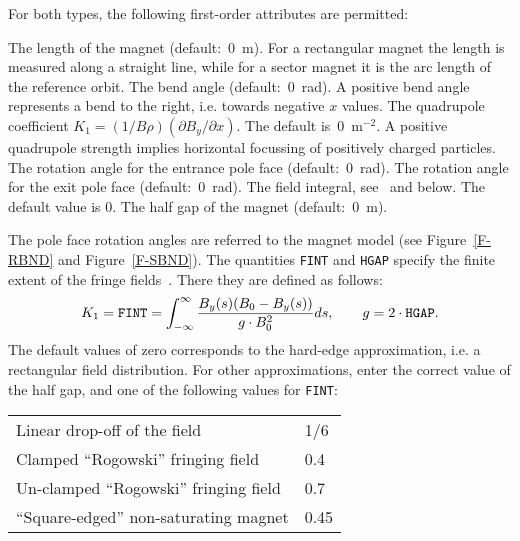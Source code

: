 For both types,
the following first-order attributes are permitted:
\begin{mylist}
The length of the magnet (default:~0~m).
For a rectangular magnet the length is measured along a straight line,
while for a sector magnet it is the arc length of the reference orbit.
The bend angle (default:~0~rad).
A positive bend angle represents a bend to the right,
i.e. towards negative \(x\) values.
The quadrupole coefficient
\(K_{1}=(1/B\rho) (\partial B_{y}/\partial x)\).
The default is~0~\(\mathrm{m}^{-2}\).
A positive quadrupole strength implies horizontal focussing
of positively charged particles.
The rotation angle for the entrance pole face
(default:~0~rad).
The rotation angle for the exit pole face
(default:~0~rad).
The field integral, see~\cite{B-BRO72} and below. The default value is 0.
The half gap of the magnet (default:~0~m).
\end{mylist}
The pole face rotation angles are referred to the magnet model
(see Figure~\ref{F-RBND} and Figure~\ref{F-SBND}).
The quantities {\tt FINT} and {\tt HGAP} specify
the finite extent of the fringe fields~\cite{B-BRO72}.
There they are defined as follows:
\[
K_1 = \hbox{\tt FINT} = \int_{-\infty}^{\infty}
\frac{B_y(s) (B_0 - B_y(s))}{g \cdot B_0^2} ds,
\qquad
g = 2 \cdot \hbox{\tt HGAP}.
\]
The default values of zero corresponds to the hard-edge approximation,
i.e. a rectangular field distribution.
For other approximations, enter the correct value of the half gap,
and one of the following values for {\tt FINT}:
\begin{center}
\begin{tabular}{ll}
Linear drop-off of the field           &1/6 \\
Clamped ``Rogowski'' fringing field    &0.4 \\
Un-clamped ``Rogowski'' fringing field  &0.7 \\
``Square-edged'' non-saturating magnet &0.45
\end{tabular}
\end{center}
